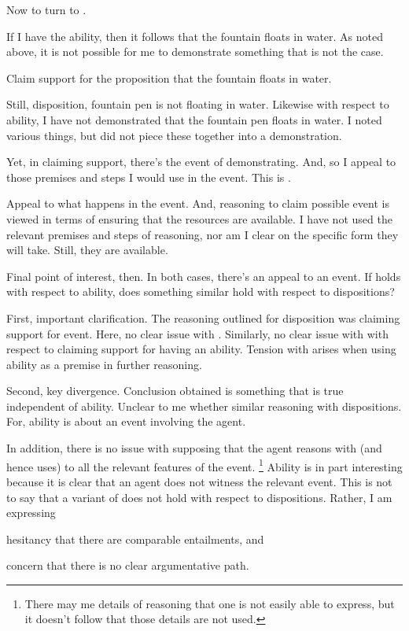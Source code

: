 \begin{note}[Diverge]
  Now to turn to \EAS{}.

  If I have the ability, then it follows that the fountain floats in water.
  As noted above, it is not possible for me to demonstrate something that is not the case.

  Claim support for the proposition that the fountain floats in water.

  Still, disposition, fountain pen is not floating in water.
  Likewise with respect to ability, I have not demonstrated that the fountain pen floats in water.
  I noted various things, but did not piece these together into a demonstration.

  Yet, in claiming support, there's the event of demonstrating.
  And, so I appeal to those premises and steps I would use in the event.
  This is \EAS{}.

  Appeal to what happens in the event.
  And, reasoning to claim possible event is viewed in terms of ensuring that the resources are available.
  I have not used the relevant premises and steps of reasoning, nor am I clear on the specific form they will take.
  Still, they are available.

  Final point of interest, then.
  In both cases, there's an appeal to an event.
  If \EAS{} holds with respect to ability, does something similar hold with respect to dispositions?

  First, important clarification.
  The reasoning outlined for disposition was claiming support for event.
  Here, no clear issue with \ESU{}.
  Similarly, no clear issue with \ESU{} with respect to claiming support for having an ability.
  Tension with \ESU{} arises when using ability as a premise in further reasoning.

  Second, key divergence.
  Conclusion obtained is something that is true independent of ability.
  Unclear to me whether similar reasoning with dispositions.
  For, ability is about an event involving the agent.

  In addition, there is no issue with supposing that the agent reasons with (and hence uses) to all the relevant features of the event.\nolinebreak
  \footnote{There may me details of reasoning that one is not easily able to express, but it doesn't follow that those details are not used.}
  Ability is in part interesting because it is clear that an agent does not witness the relevant event.
  This is not to say that a variant of \EAS{} does not hold with respect to dispositions.
  Rather, I am expressing
  \begin{enumerate*}
  \item hesitancy that there are comparable entailments, and
  \item concern that there is no clear argumentative path.
  \end{enumerate*}


\end{note}
